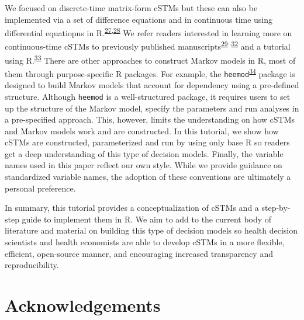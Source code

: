 \documentclass[
]{article}
\begin{document}
We focused on discrete-time matrix-form cSTMs but these can also be implemented via a set of difference equations and in continuous time using differential equatiopns in R.\textsuperscript{\protect\hyperlink{ref-Grimmett2014}{27},\protect\hyperlink{ref-Axler2005}{28}} We refer readers interested in learning more on continuous-time cSTMs to previously published manuscripts\textsuperscript{\protect\hyperlink{ref-Cao2016}{29}--\protect\hyperlink{ref-Soares2012}{32}} and a tutorial using R.\textsuperscript{\protect\hyperlink{ref-Frederix2013a}{33}} There are other approaches to construct Markov models in R, most of them through purpose-specific R packages. For example, the \texttt{heemod}\textsuperscript{\protect\hyperlink{ref-Filipovic-Pierucci2017}{34}} package is designed to build Markov models that account for dependency using a pre-defined structure. Although \texttt{heemod} is a well-structured package, it requires users to set up the structure of the Markov model, specify the parameters and run analyses in a pre-specified approach. This, however, limits the understanding on how cSTMs and Markov models work and are constructed. In this tutorial, we show how cSTMs are constructed, parameterized and run by using only base R so readers get a deep understanding of this type of decision models. Finally, the variable names used in this paper reflect our own style. While we provide guidance on standardized variable names, the adoption of these conventions are ultimately a personal preference.

In summary, this tutorial provides a conceptualization of cSTMs and a step-by-step guide to implement them in R. We aim to add to the current body of literature and material on building this type of decision models so health decision scientists and health economists are able to develop cSTMs in a more flexible, efficient, open-source manner, and encouraging increased transparency and reproducibility.

\hypertarget{acknowledgements}{%
\section{Acknowledgements}\label{acknowledgements}}
\end{document}
